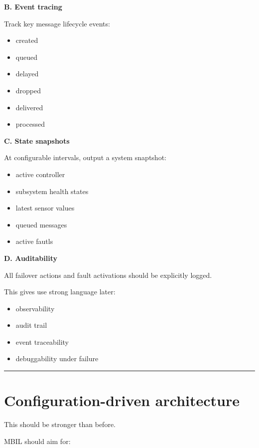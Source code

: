 \documentclass{report}
\begin{document}
\textbf{B. Event tracing}

Track key message lifecycle events:
\begin{itemize}
   \item created
   \item queued
   \item delayed
   \item dropped
   \item delivered
   \item processed
\end{itemize}

\textbf{C. State snapshots}

At configurable intervals, output a system snaptshot:
\begin{itemize}
   \item active controller
   \item subsystem health states
   \item latest sensor values
   \item queued messages
   \item active fautls
\end{itemize}

\textbf{D. Auditability}

All failover actions and fault activations should be explicitly logged. 

This gives use strong language later:
\begin{itemize}
   \item observability
   \item audit trail 
   \item event traceability
   \item debuggability under failure
\end{itemize}


\begin{center}
\rule{0.9\textwidth}{1pt}
\end{center}
\section{Configuration-driven architecture}

This should be stronger than before. 

MBIL should aim for:
\end{document}
